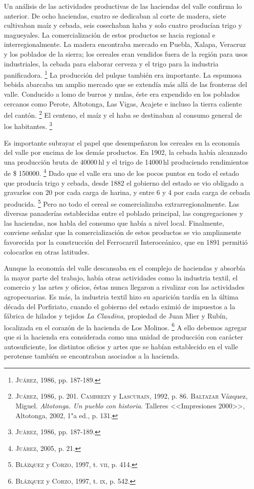 \documentclass[14pt,twoside,final]{extbook} %
\let\oldfootnote\footnote
\renewcommand\footnote[1]{%
\oldfootnote{\hspace{1mm}#1}}
\begin{document}
Un análisis de las actividades productivas de las haciendas del valle confirma lo anterior. De ocho haciendas, cuatro se dedicaban al corte de madera, siete cultivaban maíz y cebada, seis cosechaban haba y solo cuatro producían trigo y magueyales. La comercialización de estos productos se hacia regional e interregionalmente. La madera encontraba mercado en Puebla, Xalapa, Veracruz y los poblados de la sierra; los cereales eran vendidos fuera de la región para usos industriales, la cebada para elaborar cerveza y el trigo para la industria panificadora.\footnote{\textsc{Juárez}, 1986, pp. 187-189.} La producción del pulque también era importante. La espumosa bebida abarcaba un amplio mercado que se extendía más allá de las fronteras del valle. Conducido a lomo de burros y mulas, éste era expendido en los poblados cercanos como Perote, Altotonga, Las Vigas, Acajete e incluso la tierra caliente del cantón.\footnote{\textsc{Juárez}, 1986, p. 201. \textsc{Cambrezy} y \textsc{Lascurain}, 1992, p. 86. \textsc{Baltazar} Vázquez, Miguel. \emph{Altotonga. Un pueblo con historia}. Talleres <<Impresiones 2000>>, Altotonga, 2002, 1"a ed., p. 131.} El centeno, el maíz y el haba se destinaban al consumo general de los habitantes.\footnote{\textsc{Juárez}, 1986, pp. 187-189.}

Es importante subrayar el papel que desempeñaron los cereales en la economía del valle por encima de los demás productos. En 1902, la cebada había alcanzado una producción bruta de 40000\,hl y el trigo de 14000\,hl produciendo rendimientos de \$ 150000.\footnote{\textsc{Juárez}, 2005, p. 21.} Dado que el valle era uno de los pocos puntos en todo el estado que producía trigo y cebada, desde 1882 el gobierno del estado se vio obligado a gravarlos con \textcent{} 20 por cada carga de harina, y entre \textcent{} 6 y \textcent{} 4 por cada carga de cebada producida.\footnote{\textsc{Blázquez} y \textsc{Corzo}, 1997, t. \textsc{vii}, p. 414.} Pero no todo el cereal se comercializaba extrarregionalmente. Las diversas panaderías establecidas entre el poblado principal, las congregaciones y las haciendas, nos habla del consumo que había a nivel local. Finalmente, conviene señalar que la comercialización de estos productos se vio ampliamente favorecida por la construcción del Ferrocarril Interoceánico, que en 1891 permitió colocarlos en otras latitudes.

Aunque la economía del valle descansaba en el complejo de haciendas y absorbía la mayor parte del trabajo, había otras actividades como la industria textil, el comercio y las artes y oficios, éstas nunca llegaron a rivalizar con las actividades agropecuarias. Es más, la industria textil hizo su aparición tardía en la última década del Porfiriato, cuando el gobierno del estado eximió de impuestos a la fábrica de hilados y tejidos \emph{La Claudina}, propiedad de Juan Mier y Rubín, localizada en el corazón de la hacienda de Los Molinos.\footnote{\textsc{Blázquez} y \textsc{Corzo}, 1997, t. \textsc{ix}, p. 542.} A ello debemos agregar que si la hacienda era considerada como una unidad de producción con carácter autosuficiente, los distintos oficios y artes que se habían establecido en el valle perotense también se encontraban asociados a la hacienda.
\end{document}
